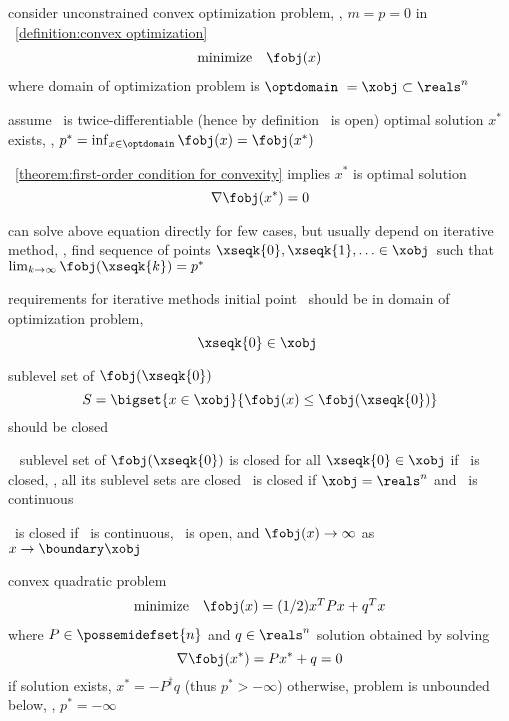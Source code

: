 \documentclass[17pt,landscape]{foils}
\begin{document}
{\bit
\item
	consider
	unconstrained convex optimization problem,
	\ie, $m=p=0$ in ~\ref{definition:convex optimization}
	$$
		\begin{array}{ll}
			\mbox{minimize} &
				\fobj(x)
		\end{array}
	$$
	where
		domain of optimization problem is $\optdomain\ = \xobj \subset \reals^n$

\vitem
	assume
	\bit
	\vitem
		\fobj\ is twice-differentiable (hence by definition \xobj\ is open)
	\vitem
		optimal solution $x^\ast$ exists, \ie, $p^\ast = \inf_{x\in\optdomain} \fobj(x) = \fobj(x^\ast)$
	\eit

\vitem
	\theoremname~\ref{theorem:first-order condition for convexity}
	implies
	$x^\ast$ is optimal solution\
	\iaoi\
	$$
		\nabla \fobj(x^\ast) = 0
	$$

\vitem
	can solve above equation directly for few cases,
	but usually
	depend on iterative method,
	\ie,
	find sequence of points $\xseqk{0}, \xseqk{1}, \ldots \in \xobj$\
	such that
	$
		\lim_{k\to\infty} \fobj(\xseqk{k}) = p^\ast
	$
\eit
\vfill



\bit
\item
	requirements for iterative methods
	\bit
	\vitem
		initial point \ should be in domain of optimization problem,
		\ie\
		$$
			\xseqk{0} \in \xobj\
		$$

	\vitem
		sublevel set of $\fobj(\xseqk{0})$
		$$
			S = \bigset{x\in\xobj}{\fobj(x) \leq \fobj(\xseqk{0})}
		$$
		should be closed
	\eit

\vitem
	\eg\
	\bit
	\vitem
		sublevel set of $\fobj(\xseqk{0})$
		is closed for all $\xseqk{0}\in\xobj$
		if \fobj\ is closed, \ie, all its sublevel sets are closed
	\vitem
		\fobj\ is closed
		if $\xobj = \reals^n$ and \fobj\ is continuous\

	\vitem
		\fobj\ is closed
		if \fobj\ is continuous,
		\xobj\ is open,
		and $\fobj(x) \to \infty$ as $x \to \boundary \xobj$

	\eit
\eit
\vfill



\bit
\item
	convex quadratic problem
	$$
		\begin{array}{ll}
			\mbox{minimize} &
				\fobj(x) =
				(1/2) x^TP x +q^Tx
		\end{array}
	$$
	where $P\in\possemidefset{n}$ and $q\in\reals^n$
	\bit
	\vitem
		solution obtained by solving
		$$
			\nabla \fobj(x^\ast) = P x^\ast + q = 0
		$$
		\bit
		\viitem
			if solution exists, $x^\ast = - P^\dagger q$ (thus $p^\ast>-\infty$)
		\viitem
			otherwise, problem is unbounded below, \ie, $p^\ast = -\infty$
		\eit

}
\end{document}
